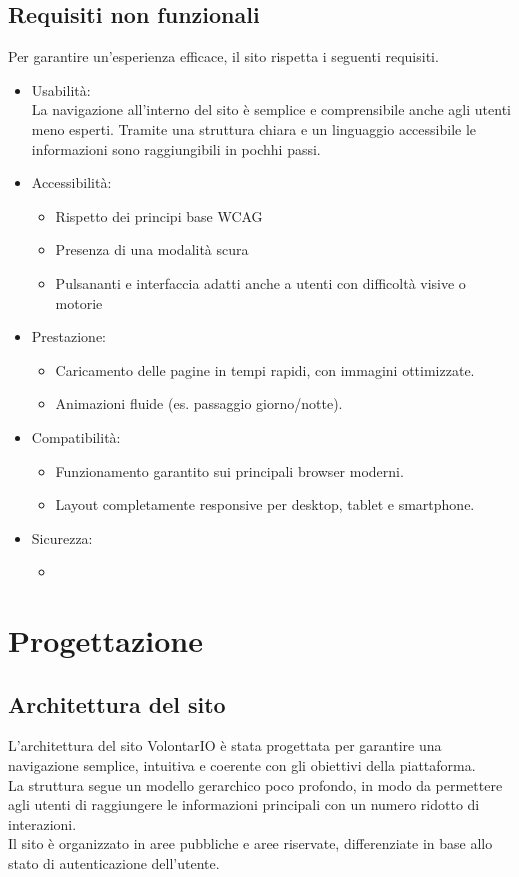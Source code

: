 \documentclass[a4paper,11pt]{article}
\begin{document}
\subsection{Requisiti non funzionali}
Per garantire un'esperienza efficace, il sito rispetta i seguenti requisiti.
\begin{itemize}
    \item Usabilità:\\La navigazione all'interno del sito è semplice e comprensibile anche agli utenti meno esperti. Tramite una struttura chiara e un linguaggio accessibile le informazioni sono raggiungibili in pochhi passi.
    \item Accessibilità:
    \begin{itemize}
        \item Rispetto dei principi base WCAG
        \item Presenza di una modalità scura
        \item Pulsananti e interfaccia adatti anche a utenti con difficoltà visive o motorie
    \end{itemize}
    \item Prestazione:
    \begin{itemize}
        \item Caricamento delle pagine in tempi rapidi, con immagini ottimizzate.
        \item Animazioni fluide (es. passaggio giorno/notte).
    \end{itemize}
    \item Compatibilità:
    \begin{itemize}
        \item Funzionamento garantito sui principali browser moderni.
        \item Layout completamente responsive per desktop, tablet e smartphone.
    \end{itemize}
    \item Sicurezza:
    \begin{itemize}
        \item 
    \end{itemize}
    \end{itemize}


\section{Progettazione}
\subsection{Architettura del sito}
L’architettura del sito VolontarIO è stata progettata per garantire una navigazione semplice, intuitiva e coerente con gli obiettivi della piattaforma.\\
La struttura segue un modello gerarchico poco profondo, in modo da permettere agli utenti di raggiungere le informazioni principali con un numero ridotto di interazioni.\\
Il sito è organizzato in aree pubbliche e aree riservate, differenziate in base allo stato di autenticazione dell’utente.\\
\end{document}
